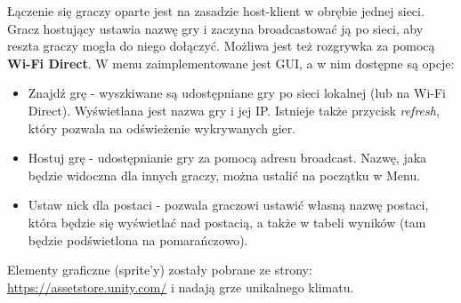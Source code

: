 \documentclass[]{report}
\begin{document}
Łączenie się graczy oparte jest na zasadzie host-klient w obrębie jednej sieci. Gracz hostujący ustawia nazwę gry i zaczyna broadcastować ją po sieci, aby reszta graczy mogła do niego dołączyć. Możliwa jest też rozgrywka za pomocą \textbf{Wi-Fi Direct}. W menu zaimplementowane jest GUI, a w nim dostępne są opcje:
\begin{itemize}
	\item Znajdź grę - wyszkiwane są udostępniane gry po sieci lokalnej (lub na Wi-Fi Direct). Wyświetlana jest nazwa gry i jej IP. Istnieje także przycisk \textit{refresh}, który pozwala na odświeżenie wykrywanych gier.
	\item Hostuj grę - udostępnianie gry za pomocą adresu broadcast. Nazwę, jaka będzie widoczna dla innych graczy, można ustalić na początku w Menu.
	\item Ustaw nick dla postaci - pozwala graczowi ustawić własną nazwę postaci, która będzie się wyświetlać nad postacią, a także w tabeli wyników (tam będzie podświetlona na pomarańczowo).
\end{itemize}
Elementy graficzne (sprite'y) zostały pobrane ze strony: 
\href{https://assetstore.unity.com/}{https://assetstore.unity.com/} i nadają grze unikalnego klimatu.
\end{document}
